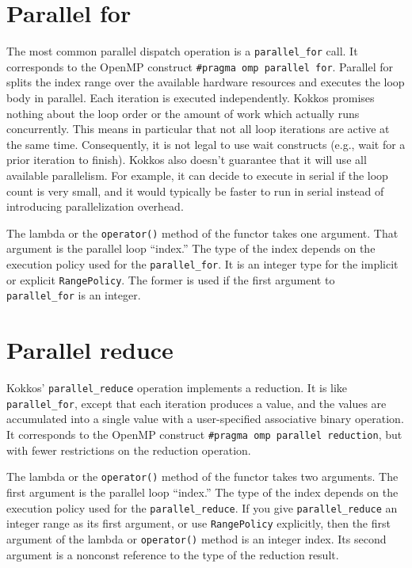 \section{Parallel for}

The most common parallel dispatch operation is a \lstinline|parallel_for| call.
It corresponds to the OpenMP construct \lstinline!#pragma omp parallel for!.
Parallel for splits the index range over the available hardware resources and executes the loop body in parallel.
Each iteration is executed independently.
Kokkos promises nothing about the loop order or the amount of work which actually runs concurrently. 
This means in particular that not all loop iterations are active at the same time.  Consequently, it is not legal to use wait constructs (e.g., wait for a prior iteration to finish). 
Kokkos also doesn't guarantee that it will use all available parallelism. 
For example, it can decide to execute in serial if the loop count is very small, and it would typically be faster to run in serial instead of introducing parallelization overhead.

The lambda or the \lstinline!operator()! method of the functor takes one argument.  That argument is the parallel loop ``index.''
The type of the index depends on the execution policy used for the \lstinline!parallel_for!.  It is an integer type for the implicit or explicit \lstinline|RangePolicy|.
The former is used if the first argument to \lstinline|parallel_for| is an integer. 

\section{Parallel reduce}

Kokkos' \lstinline!parallel_reduce! operation implements a reduction.
It is like \lstinline!parallel_for!, except that each iteration
produces a value, and the values are accumulated into a single value
with a user-specified associative binary operation.  It corresponds to
the OpenMP construct \lstinline!#pragma omp parallel reduction!, but
with fewer restrictions on the reduction operation.

The lambda or the \lstinline!operator()! method of the functor takes two arguments.
The first argument is the parallel loop ``index.''
The type of the index depends on the execution policy used for the \lstinline!parallel_reduce!.
If you give \lstinline!parallel_reduce! an integer range as its first argument,
or use \lstinline!RangePolicy! explicitly,
then the first argument of the lambda or \lstinline!operator()! method is an integer index.
Its second argument is a nonconst reference to the type of the reduction result.

